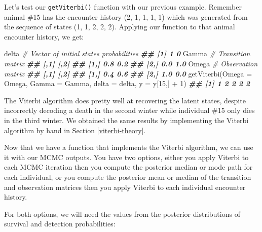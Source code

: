 \documentclass[
  12pt,
]{krantz}
\newenvironment{Shaded}{\begin{snugshade}}{\end{snugshade}}
\newcommand{\AttributeTok}[1]{\textcolor[rgb]{0.77,0.63,0.00}{#1}}
\newcommand{\CommentTok}[1]{\textcolor[rgb]{0.56,0.35,0.01}{\textit{#1}}}
\newcommand{\DecValTok}[1]{\textcolor[rgb]{0.00,0.00,0.81}{#1}}
\newcommand{\DocumentationTok}[1]{\textcolor[rgb]{0.56,0.35,0.01}{\textbf{\textit{#1}}}}
\newcommand{\FunctionTok}[1]{\textcolor[rgb]{0.00,0.00,0.00}{#1}}
\newcommand{\NormalTok}[1]{#1}
\newcommand{\OtherTok}[1]{\textcolor[rgb]{0.56,0.35,0.01}{#1}}
\newcommand{\SpecialCharTok}[1]{\textcolor[rgb]{0.00,0.00,0.00}{#1}}
\newcommand{\StringTok}[1]{\textcolor[rgb]{0.31,0.60,0.02}{#1}}
\begin{document}
Let's test our \texttt{getViterbi()} function with our previous example. Remember animal \#15 has the encounter history (2, 1, 1, 1, 1) which was generated from the sequence of states (1, 1, 2, 2, 2). Applying our function to that animal encounter history, we get:

\begin{Shaded}
\begin{Highlighting}[]
\NormalTok{delta }\CommentTok{\# Vector of initial states probabilities}
\DocumentationTok{\#\# [1] 1 0}
\NormalTok{Gamma }\CommentTok{\# Transition matrix}
\DocumentationTok{\#\#      [,1] [,2]}
\DocumentationTok{\#\# [1,]  0.8  0.2}
\DocumentationTok{\#\# [2,]  0.0  1.0}
\NormalTok{Omega }\CommentTok{\# Observation matrix}
\DocumentationTok{\#\#      [,1] [,2]}
\DocumentationTok{\#\# [1,]  0.4  0.6}
\DocumentationTok{\#\# [2,]  1.0  0.0}
\FunctionTok{getViterbi}\NormalTok{(}\AttributeTok{Omega =}\NormalTok{ Omega, }
           \AttributeTok{Gamma =}\NormalTok{ Gamma, }
           \AttributeTok{delta =}\NormalTok{ delta, }
           \AttributeTok{y =}\NormalTok{ y[}\DecValTok{15}\NormalTok{,] }\SpecialCharTok{+} \DecValTok{1}\NormalTok{)}
\DocumentationTok{\#\# [1] 1 2 2 2 2}
\end{Highlighting}
\end{Shaded}

The Viterbi algorithm does pretty well at recovering the latent states, despite incorrectly decoding a death in the second winter while individual \#15 only dies in the third winter. We obtained the same results by implementing the Viterbi algorithm by hand in Section \ref{viterbi-theory}.

Now that we have a function that implements the Viterbi algorithm, we can use it with our MCMC outputs. You have two options, either you apply Viterbi to each MCMC iteration then you compute the posterior median or mode path for each individual, or you compute the posterior mean or median of the transition and observation matrices then you apply Viterbi to each individual encounter history.

For both options, we will need the values from the posterior distributions of survival and detection probabilities:

\begin{Shaded}
\end{Shaded}
\end{document}
